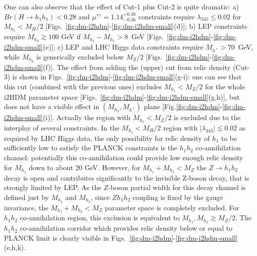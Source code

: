 One can also observe that the effect of Cut-1 plus Cut-2 is quite dramatic: a)
$Br(H\to h_1 h_1)<0.28$ and $\mu^{\gamma\gamma} = 1.14^{+0.38}_{-0.36}$ constraints
require $\lambda_{345}\leq 0.02$ for $M_{h_1}<M_H/2$
[Figs.~\ref{fig:dm-i2hdm}-\ref{fig:dm-i2hdm-small}(d)]; b) LEP constraints require $M_{h_2}\gtrsim 100$ GeV if 
$M_{h_2}-M_{h_1}>8$~GeV [Figs.~\ref{fig:dm-i2hdm}-\ref{fig:dm-i2hdm-small}(e)]; c) LEP and LHC Higgs data constraints 
require  $M_{h^+}>70$~GeV, while $M_{h_2}$ is generically excluded below $M_Z/2$ [Figs.~\ref{fig:dm-i2hdm}-\ref{fig:dm-i2hdm-small}(f)].
The effect from adding the (upper) cut from relic density (Cut-3)
is shown in Figs.~\ref{fig:dm-i2hdm}-\ref{fig:dm-i2hdm-small}(g-i): one can see that this cut
(combined with the previous ones)
excludes $M_{h_1}<M_Z/2$
for the whole i2HDM parameter space [Figs.~\ref{fig:dm-i2hdm}-\ref{fig:dm-i2hdm-small}(g,h)],
but does not have a visible effect in  $(M_{h_2},M_{h^{+}})$ plane [Fig.\ref{fig:dm-i2hdm}-\ref{fig:dm-i2hdm-small}(i)].
Actually the  region with $M_{h_1}<M_Z/2$ is excluded due to the interplay of several constraints.
In the  $M_{h_1}<M_H/2$ region with $|\lambda_{345}|\lesssim 0.02$ as required by LHC Higgs data,
the only possibility for relic density of $h_1$ to be sufficiently low to satisfy the PLANCK constraints
is the $h_1 h_2$ co-annihilation channel:
potentially this co-annihilation could provide low enough relic density 
for $M_{h_1}$ down to about 20 GeV. However,  for $M_{h_1}+M_{h_2}< M_Z$
the $Z\to h_1 h_2$ decay is open and contributes significantly to the invisible
Z-boson decay, that is strongly limited by LEP. As the $Z$-boson partial width for this decay channel
is defined just by $M_{h_1}$ and $M_{h_2}$, since $Z h_1 h_2$ coupling is fixed by the gauge invariance,
the $M_{h_1}+M_{h_2}< M_Z$ parameter space is completely excluded. 
For  $h_1 h_2$ co-annihilation region, this exclusion is equivalent to   $M_{h_1}, M_{h_2} \gtrsim M_Z/2$.
The $h_1 h_2$ co-annihilation corridor which provides relic density
below or equal to PLANCK limit is clearly visible in Figs.~\ref{fig:dm-i2hdm}-\ref{fig:dm-i2hdm-small}(e,h,k).

